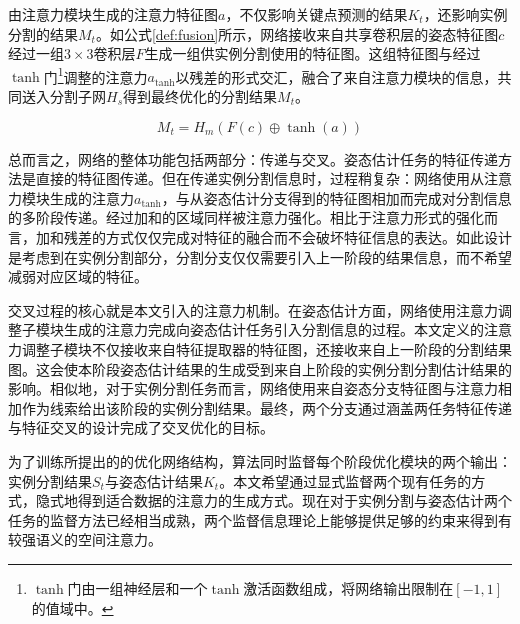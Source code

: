 由注意力模块生成的注意力特征图$a$，不仅影响关键点预测的结果$K_t$，还影响实例分割的结果$M_t$。如公式\eqref{def:fusion}所示，网络接收来自共享卷积层的姿态特征图$c$ 经过一组$3\times3$卷积层$F$生成一组供实例分割使用的特征图。这组特征图与经过$\tanh$门\footnote{$\tanh$门由一组神经层和一个$\tanh$激活函数组成，将网络输出限制在$[-1, 1]$的值域中。}调整的注意力$a_{\tanh}$以残差的形式交汇，融合了来自注意力模块的信息，共同送入分割子网$H_s$得到最终优化的分割结果$M_t$。

\begin{equation}
\label{def:fusion}
M_t = H_m(F(c) \oplus \tanh(a))
\end{equation}

总而言之，网络的整体功能包括两部分：传递与交叉。姿态估计任务的特征传递方法是直接的特征图传递。但在传递实例分割信息时，过程稍复杂：网络使用从注意力模块生成的注意力$a_{\tanh}$，与从姿态估计分支得到的特征图相加而完成对分割信息的多阶段传递。经过加和的区域同样被注意力强化。相比于注意力形式的强化而言，加和残差的方式仅仅完成对特征的融合而不会破坏特征信息的表达。如此设计是考虑到在实例分割部分，分割分支仅仅需要引入上一阶段的结果信息，而不希望减弱对应区域的特征。

交叉过程的核心就是本文引入的注意力机制。在姿态估计方面，网络使用注意力调整子模块生成的注意力完成向姿态估计任务引入分割信息的过程。本文定义的注意力调整子模块不仅接收来自特征提取器的特征图，还接收来自上一阶段的分割结果图。这会使本阶段姿态估计结果的生成受到来自上阶段的实例分割分割估计结果的影响。相似地，对于实例分割任务而言，网络使用来自姿态分支特征图与注意力相加作为线索给出该阶段的实例分割结果。最终，两个分支通过涵盖两任务特征传递与特征交叉的设计完成了交叉优化的目标。

为了训练所提出的的优化网络结构，算法同时监督每个阶段优化模块的两个输出：实例分割结果$S_t$与姿态估计结果$K_t$。本文希望通过显式监督两个现有任务的方式，隐式地得到适合数据的注意力的生成方式。现在对于实例分割与姿态估计两个任务的监督方法已经相当成熟，两个监督信息理论上能够提供足够的约束来得到有较强语义的空间注意力。

